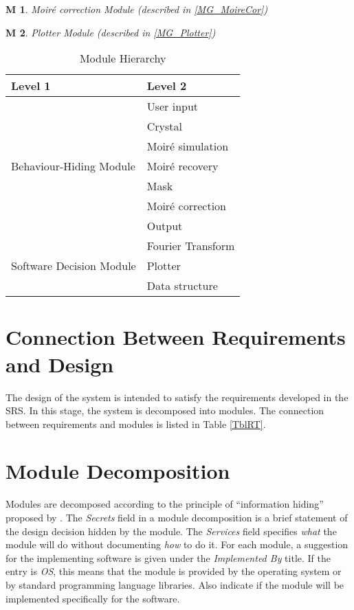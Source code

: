 \documentclass[12pt, titlepage]{article}
\newtheorem{M}{M}
\begin{document}
\begin{M}\normalfont Moir{\'e} correction Module (described in \cref{MG_MoireCor})
\label{M_MoireCor}
\end{M}

\begin{M}\normalfont Plotter Module (described in \cref{MG_Plotter})
\label{M_Plotter}
\end{M}

\begin{table}[H]
\centering
\begin{tabular}{p{} p{}}
\toprule
\textbf{Level 1} & \textbf{Level 2}\\
\midrule

\multirow{7}{0.3\textwidth}{Behaviour-Hiding Module} & User input\\
& Crystal \\
& Moir{\'e} simulation \\
& Moir{\'e} recovery \\
& Mask \\
& Moir{\'e} correction\\
& Output \\
\midrule

\multirow{3}{0.3\textwidth}{Software Decision Module} & Fourier Transform \\
& Plotter \\
& Data structure \\
\bottomrule

\end{tabular}
\caption{Module Hierarchy}
\label{TblMH}
\end{table}

\section{Connection Between Requirements and Design} \label{SecConnection}

The design of the system is intended to satisfy the requirements developed in
the SRS. In this stage, the system is decomposed into modules. The connection
between requirements and modules is listed in Table \ref{TblRT}.

\section{Module Decomposition} \label{SecMD}

Modules are decomposed according to the principle of ``information hiding''
proposed by \cite{ParnasEtAl1984}. The \emph{Secrets} field in a module
decomposition is a brief statement of the design decision hidden by the
module. The \emph{Services} field specifies \emph{what} the module will do
without documenting \emph{how} to do it. For each module, a suggestion for the
implementing software is given under the \emph{Implemented By} title. If the
entry is \emph{OS}, this means that the module is provided by the operating
system or by standard programming language libraries.  Also indicate if the
module will be implemented specifically for the software.
\end{document}
